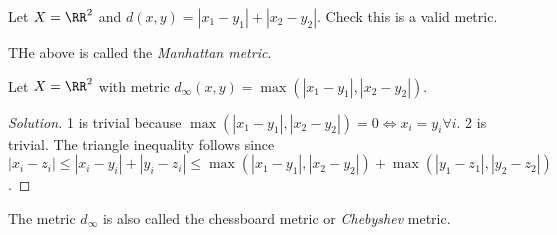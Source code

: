 \begin{exercise}
  Let $X=\RR^{2}$ and $d(x,y)=|x_1-y_1|+|x_2-y_2|$. Check this is a valid
  metric.
\end{exercise}
THe above is called the \emph{Manhattan metric}.

\begin{exercise}
  Let $X=\RR^2$ with metric $d_{\infty}(x,y)=\max{(|x_1-y_1|,|x_2-y_2|)}$.
\end{exercise}
\begin{proof}[Solution]
  1 is trivial because $\max (|x_1-y_1|,|x_2-y_2|)=0 \iff x_i=y_i \forall i$. 2
  is trivial.  The triangle inequality follows since $|x_i-z_i|\leq
  |x_i-y_i|+|y_i-z_i| \leq \max(|x_1-y_1|,|x_2-y_2|)+\max(|y_1-z_1|,|y_2-z_2|)$.
\end{proof}
\begin{remark}
  The metric $d_{\infty}$ is also called the chessboard metric or
  \emph{Chebyshev} metric.
\end{remark}
